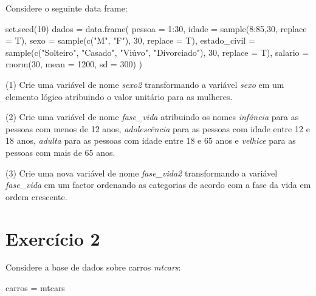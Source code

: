 \documentclass[
  letterpaper,
  DIV=11,
  numbers=noendperiod]{scrreprt}
\newenvironment{Shaded}{\begin{snugshade}}{\end{snugshade}}
\newcommand{\AttributeTok}[1]{\textcolor[rgb]{0.40,0.45,0.13}{#1}}
\newcommand{\DecValTok}[1]{\textcolor[rgb]{0.68,0.00,0.00}{#1}}
\newcommand{\FunctionTok}[1]{\textcolor[rgb]{0.28,0.35,0.67}{#1}}
\newcommand{\NormalTok}[1]{\textcolor[rgb]{0.00,0.23,0.31}{#1}}
\newcommand{\OtherTok}[1]{\textcolor[rgb]{0.00,0.23,0.31}{#1}}
\newcommand{\SpecialCharTok}[1]{\textcolor[rgb]{0.37,0.37,0.37}{#1}}
\newcommand{\StringTok}[1]{\textcolor[rgb]{0.13,0.47,0.30}{#1}}
\begin{document}
Considere o seguinte data frame:

\begin{Shaded}
\begin{Highlighting}[]
\FunctionTok{set.seed}\NormalTok{(}\DecValTok{10}\NormalTok{)}
\NormalTok{dados }\OtherTok{=} \FunctionTok{data.frame}\NormalTok{(}
  \AttributeTok{pessoa =} \DecValTok{1}\SpecialCharTok{:}\DecValTok{30}\NormalTok{,}
  \AttributeTok{idade =} \FunctionTok{sample}\NormalTok{(}\DecValTok{8}\SpecialCharTok{:}\DecValTok{85}\NormalTok{,}\DecValTok{30}\NormalTok{, }\AttributeTok{replace =}\NormalTok{ T),}
  \AttributeTok{sexo =} \FunctionTok{sample}\NormalTok{(}\FunctionTok{c}\NormalTok{(}\StringTok{"M"}\NormalTok{, }\StringTok{"F"}\NormalTok{), }\DecValTok{30}\NormalTok{, }\AttributeTok{replace =}\NormalTok{ T),}
  \AttributeTok{estado\_civil =} \FunctionTok{sample}\NormalTok{(}\FunctionTok{c}\NormalTok{(}\StringTok{"Solteiro"}\NormalTok{, }\StringTok{"Casado"}\NormalTok{, }\StringTok{"Viúvo"}\NormalTok{, }\StringTok{"Divorciado"}\NormalTok{), }\DecValTok{30}\NormalTok{, }\AttributeTok{replace =}\NormalTok{ T),}
  \AttributeTok{salario =} \FunctionTok{rnorm}\NormalTok{(}\DecValTok{30}\NormalTok{, }\AttributeTok{mean =} \DecValTok{1200}\NormalTok{, }\AttributeTok{sd =} \DecValTok{300}\NormalTok{)}
\NormalTok{)}
\end{Highlighting}
\end{Shaded}

(1) Crie uma variável de nome \emph{sexo2} transformando a variável
\emph{sexo} em um elemento lógico atribuindo o valor unitário para as
mulheres.

(2) Crie uma variável de nome \emph{fase\_vida} atribuindo os nomes
\emph{infância} para as pessoas com menos de 12 anos,
\emph{adolescência} para as pessoas com idade entre 12 e 18 anos,
\emph{adulta} para as pessoas com idade entre 18 e 65 anos e
\emph{velhice} para as pessoas com mais de 65 anos.

(3) Crie uma nova variável de nome \emph{fase\_vida2} transformando a
variável \emph{fase\_vida} em um factor ordenando as categorias de
acordo com a fase da vida em ordem crescente.

\section{Exercício 2}\label{exercuxedcio-2-1}

Considere a base de dados sobre carros \emph{mtcars}:

\begin{Shaded}
\begin{Highlighting}[]
\NormalTok{carros }\OtherTok{=}\NormalTok{ mtcars}
\end{Highlighting}
\end{Shaded}
\end{document}
